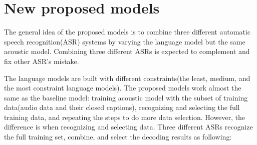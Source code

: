 \section{New proposed models}
\label{proposedModels}
The general idea of the proposed models is to combine three different automatic speech recognition(ASR) systems by varying the language model but the same acoustic model. Combining three different ASRs is expected to complement and fix other ASR's mistake. 

The language models are built with different constraints(the least, medium, and the most constraint language models). The proposed models work almost the same as the baseline model: training acoustic model with the subset of training data(audio data and their closed captions), recognizing and selecting the full training data, and repeating the steps to do more data selection. However, the difference is when recognizing and selecting data. Three different ASRs recognize the full training set, combine, and select the decoding results as following:
